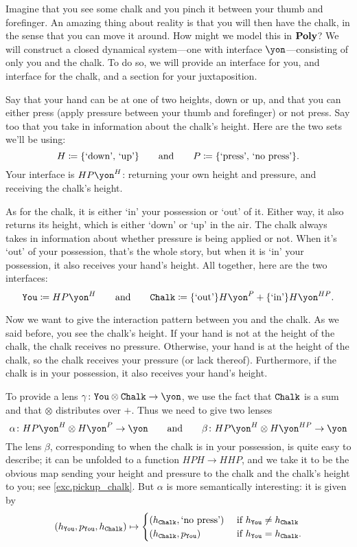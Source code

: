 \documentclass[Book-Poly]{subfiles}
\begin{document}


\begin{example}\label{ex.pickup_chalk}
Imagine that you see some chalk and you pinch it between your thumb and forefinger.
An amazing thing about reality is that you will then have the chalk, in the sense that you can move it around.
How might we model this in $\mathbf{Poly}$?
We will construct a closed dynamical system---one with interface $\yon$---consisting of only you and the chalk.
To do so, we will provide an interface for you, and interface for the chalk, and a section for your juxtaposition.

Say that your hand can be at one of two heights, down or up, and that you can either press (apply pressure between your thumb and forefinger) or not press. Say too that you take in information about the chalk's height. Here are the two sets we'll be using:
\[
	H\coloneqq\{\text{`down', `up'}\}
	\qquad\text{and}\qquad
	P\coloneqq\{\text{`press', `no press'}\}.
\]
Your interface is $HP\yon^H$: returning your own height and pressure, and receiving the chalk's height.

As for the chalk, it is either `in' your possession or `out' of it.
Either way, it also returns its height, which is either `down' or `up' in the air.
The chalk always takes in information about whether pressure is being applied or not.
When it's `out' of your possession, that's the whole story, but when it is `in' your possession, it also receives your hand's height.
All together, here are the two interfaces:
\[
	\const{You}\coloneqq HP\yon^H
	\qqand
	\const{Chalk}\coloneqq \{\text{`out'}\}H\yon^P + \{\text{`in'}\}H\yon^{HP}.
\]

Now we want to give the interaction pattern between you and the chalk.
As we said before, you see the chalk's height.
If your hand is not at the height of the chalk, the chalk receives no pressure.
Otherwise, your hand is at the height of the chalk, so the chalk receives your pressure (or lack thereof).
Furthermore, if the chalk is in your possession, it also receives your hand's height.

To provide a lens $\gamma\colon\const{You}\otimes\const{Chalk}\to\yon$, we use the fact that $\texttt{Chalk}$ is a sum and that $\otimes$ distributes over $+$.
Thus we need to give two lenses
\[
	\alpha\colon HP\yon^H\otimes H\yon^P\to\yon
	\qqand
	\beta\colon HP\yon^H\otimes H\yon^{HP}\to\yon
\]
The lens $\beta$, corresponding to when the chalk is in your possession, is quite easy to describe; it can be unfolded to a function
$HPH\to HHP$, and we take it to be the obvious map sending your height and pressure to the chalk and the chalk's height to you; see \cref{exc.pickup_chalk}. But $\alpha$ is more semantically interesting: it is given by
\[
  (h_{\texttt{You}},p_{\texttt{You}},h_{\texttt{Chalk}})\mapsto
  \begin{cases}
  	(h_{\texttt{Chalk}},\text{`no press'}) & \textnormal{ if } h_{\texttt{You}} \neq h_{\texttt{Chalk}} \\
  	(h_{\texttt{Chalk}},p_{\texttt{You}}) & \textnormal{ if } h_{\texttt{You}} = h_{\texttt{Chalk}}.
  \end{cases}
\]


\end{example}
\end{document}
